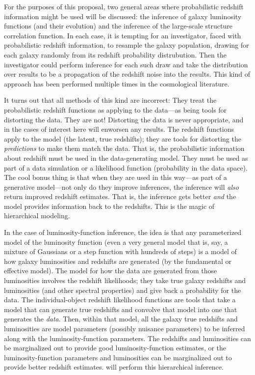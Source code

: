 \documentclass[12pt]{article}
\begin{document}
For the purposes of this proposal, two general areas where
probabilistic redshift information might be used will be discussed:
the inference of galaxy luminosity functions (and their evolution) and
the inference of the large-scale structure correlation function.
In each case, it is tempting for an investigator, faced with
probabilistic redshift information, to resample the galaxy population,
drawing for each galaxy randomly from its redshift probability
distrubution.
Then the investigator could perform inference for each such draw and
take the distribution over results to be a propagation of the redshift
noise into the results.
This kind of approach has been performed multiple times in the
cosmological literature.

It turns out that all methods of this kind are incorrect:
They treat the probabilistic redshift functions as applying to the
data---as being tools for distorting the data.
They are not!
Distorting the data is never appropriate, and in the cases of interest
here will enworsen any results.
The redshift functions apply to the model (the latent, true redshifts); they are tools
for distorting the \emph{predictions} to make them match the data.
That is, the probabilistic information about redshift must be used in
the data-generating model.
They must be used as part of a data simulation or a likelihood
function (probability in the data space).
The cool bonus thing is that when they are used in this way---as part
of a generative model---not only do they improve inferences, the
inference will \emph{also} return improved redshift estimates.  That
is, the inference gets better \emph{and} the model provides
information back to the redshifts.
This is the magic of hierarchical modeling.

In the case of luminosity-function inference,
the idea is that any parameterized model of the luminosity function
(even a very general model that is, say, a mixture of Gaussians or a
step function with hundreds of steps) is a model of how galaxy
luminosities and redshifts are generated (by the fundamental or
effective model).
The model for how the data are generated from those luminosities
involves the redshift likelihoods; they take true galaxy redshifts and
luminosities (and other spectral properties) and give back a
probability for the data.
The individual-object redshift likelihood functions are tools that
take a model that can generate true redshifts and convolve that model
into one that generates the \emph{data}.
Then, within that model, all the galaxy true redshifts and
luminosities are model parameters (possibly nuisance parameters) to be
inferred along with the luminosity-function parameters.
The redshifts and luminosities can be marginalized out to provide good
luminosity-function estimates,
or the luminosity-function parameters and luminosities can be marginalized
out to provide better redshift estimates.
 will perform this hierarchical inference.
\end{document}
